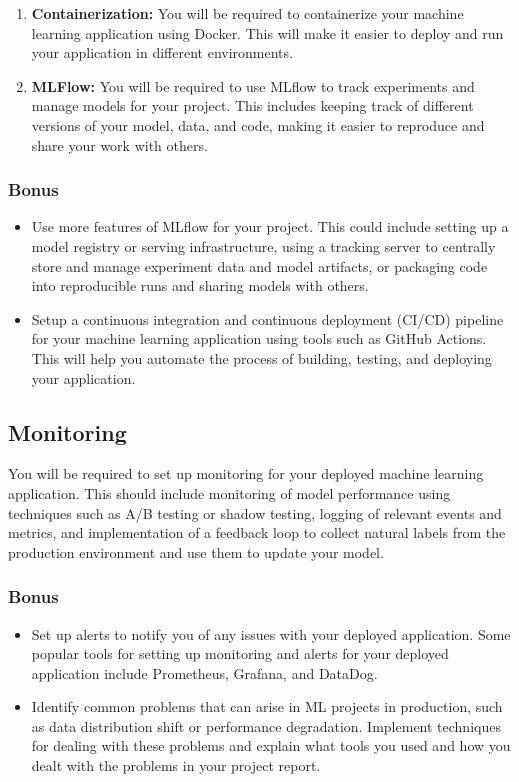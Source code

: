 \documentclass[a4paper]{article}
\begin{document}
	\begin{enumerate}
	\item \textbf{Containerization:} You will be required to containerize your machine learning application using Docker. This will make it easier to deploy and run your application in different environments.
	
	\item \textbf{MLFlow:} You will be required to use MLflow to track experiments and manage models for your project. This includes keeping track of different versions of your model, data, and code, making it easier to reproduce and share your work with others.
	
	\end{enumerate}

	\subsubsection{\textbf{Bonus}}
	\begin{itemize}
	\item Use more features of MLflow for your project. This could include setting up a model registry or serving infrastructure, using a tracking server to centrally store and manage experiment data and model artifacts, or packaging code into reproducible runs and sharing models with others.
	\item  Setup a continuous integration and continuous deployment (CI/CD) pipeline for your machine learning application using tools such as GitHub Actions. This will help you automate the process of building, testing, and deploying your application.
	\end{itemize}

	\subsection{Monitoring}
	You will be required to set up monitoring for your deployed machine learning application. This should include monitoring of model performance using techniques such as A/B testing or shadow testing, logging of relevant events and metrics, and implementation of a feedback loop to collect natural labels from the production environment and use them to update your model. 

	\subsubsection{\textbf{Bonus}}
	\begin{itemize}
	\item Set up alerts to notify you of any issues with your deployed application. Some popular tools for setting up monitoring and alerts for your deployed application include Prometheus, Grafana, and DataDog.
	\item Identify common problems that can arise in ML projects in production, such as data distribution shift or performance degradation. Implement techniques for dealing with these problems and explain what tools you used and how you dealt with the problems in your project report.
	\end{itemize}
\end{document}
